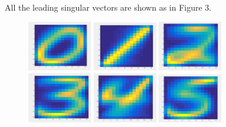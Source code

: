 \documentclass{article}
\begin{document}
\begin{enumerate}
All the leading singular vectors are shown as in Figure 3. 
 \begin{figure}
 \includegraphics[width=0.25\textwidth, height=0.25\textwidth]{newpic0}
\includegraphics[width=0.25\textwidth, height=0.25\textwidth]{newpic1}   \includegraphics[width=0.25\textwidth, height=0.25\textwidth]{newpic2}
\includegraphics[width=0.25\textwidth, height=0.25\textwidth]{newpic3}
\includegraphics[width=0.25\textwidth, height=0.25\textwidth]{newpic4}
\includegraphics[width=0.25\textwidth, height=0.25\textwidth]{newpic5}

\end{figure}
\end{enumerate}
\end{document}
